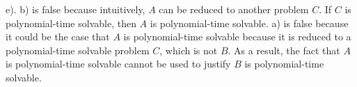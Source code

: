 \documentclass[letterpaper,12pt]{article}
\begin{document}
\begin{problem}{19.5}
\end{problem}

e). b) is false because intuitively, $A$ can be reduced to another problem $C$. If $C$ is polynomial-time solvable, then $A$ is polynomial-time solvable. a) is false because it could be the case that $A$ is polynomial-time solvable because it is reduced to a polynomial-time solvable problem $C$, which is not $B$. As a result, the fact that $A$ is polynomial-time solvable  cannot be used to justify $B$ is polynomial-time solvable.




	
	
	
	
\clearpage


\end{document}
